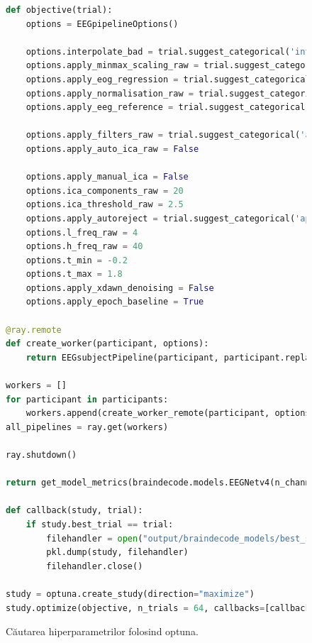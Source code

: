 \begin{figure}
\begin{lstlisting}[language=Python]
def objective(trial):
    options = EEGpipelineOptions()

    options.interpolate_bad = trial.suggest_categorical('interpolate_bad', [False, True])
    options.apply_minmax_scaling_raw = trial.suggest_categorical('apply_minmax_scaling_raw', [False, True])
    options.apply_eog_regression = trial.suggest_categorical('apply_eog_regression', [False, True])
    options.apply_normalisation_raw = trial.suggest_categorical('apply_normalisation_raw', [False, True])
    options.apply_eeg_reference = trial.suggest_categorical('apply_eeg_reference', [False, True])

    options.apply_filters_raw = trial.suggest_categorical('apply_filters_raw', [False, True])
    options.apply_auto_ica_raw = False

    options.apply_manual_ica = False
    options.ica_components_raw = 20
    options.ica_threshold_raw = 2.5
    options.apply_autoreject = trial.suggest_categorical('apply_autoreject', [False, True])
    options.l_freq_raw = 4
    options.h_freq_raw = 40
    options.t_min = -0.2
    options.t_max = 1.8
    options.apply_xdawn_denoising = False
    options.apply_epoch_baseline = True

@ray.remote
def create_worker(participant, options):
    return EEGsubjectPipeline(participant, participant.replace("raw.csv", "quizz.xlsx"), "dsi-24.elc", options)

workers = []
for participant in participants:
    workers.append(create_worker_remote(participant, options))
all_pipelines = ray.get(workers)

ray.shutdown()

return get_model_metrics(braindecode.models.EEGNetv4(n_channels=n_chans, n_outputs=3, sfreq=300, n_times=601), all_pipelines)[1]

def callback(study, trial):
    if study.best_trial == trial:
        filehandler = open("output/braindecode_models/best_study.obj", "wb")
        pkl.dump(study, filehandler)
        filehandler.close()

study = optuna.create_study(direction="maximize")
study.optimize(objective, n_trials = 64, callbacks=[callback])
\end{lstlisting}
\caption{Căutarea hiperparametrilor folosind optuna.}
\label{fig:optuna_search}
\end{figure}


